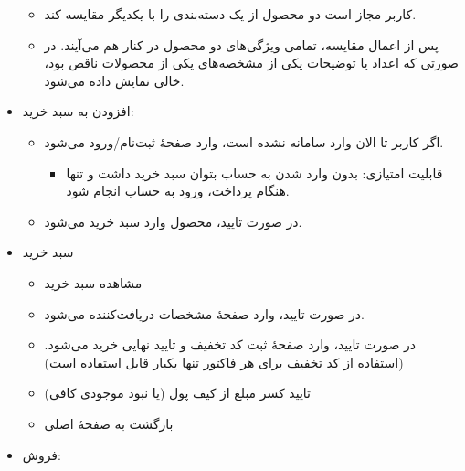 \documentclass[]{article}
\begin{document}
\begin{itemize}
\begin{itemize}
\item
کاربر مجاز است دو محصول از یک دسته‌بندی را با یکدیگر مقایسه کند.

\item
پس از اعمال مقایسه، تمامی ویژگی‌های دو محصول در کنار هم می‌آیند. در صورتی که اعداد یا توضیحات یکی از مشخصه‌های یکی از محصولات ناقص بود، خالی نمایش داده می‌شود.

\end{itemize}

\item
افزودن به سبد خرید:

\begin{itemize}

\item
اگر کاربر تا الان وارد سامانه نشده است، وارد صفحهٔ ثبت‌نام/ورود می‌شود.

\begin{itemize}[label = {$\bigstar$}]

\item
قابلیت امتیازی: بدون وارد شدن به حساب بتوان سبد خرید داشت و تنها هنگام پرداخت، ورود به حساب انجام شود.


\end{itemize}

\item
در صورت تایید، محصول وارد سبد خرید می‌شود.
\end{itemize}

\item
سبد خرید

\begin{itemize}

\item
مشاهده سبد خرید

\item
در صورت تایید، وارد صفحهٔ مشخصات دریافت‌کننده  می‌شود.

\item
در صورت تایید، وارد صفحهٔ ثبت کد تخفیف و تایید نهایی خرید می‌شود. (استفاده از کد تخفیف برای هر فاکتور تنها یکبار قابل استفاده است)

\item
تایید کسر مبلغ از کیف پول (یا نبود موجودی کافی)

\item
بازگشت به صفحهٔ اصلی

\end{itemize}

\item
فروش:

\begin{itemize}


\end{itemize}
\end{itemize}
\end{document}
